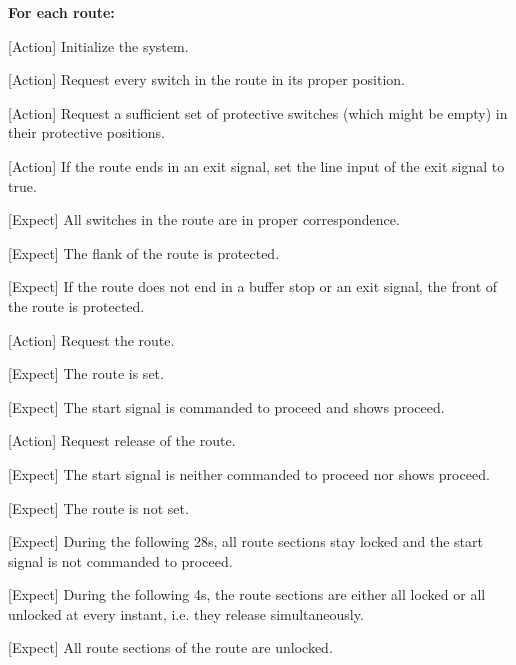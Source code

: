 \documentclass[10pt,a4paper]{article}
\begin{document}
\begin{procedurebox}
  \textbf{For each route:}
  \begin{teststeps}
    \item \textnormal{[Action]} Initialize the system.
    \item \textnormal{[Action]} Request every switch in the route in its proper position.
    \item \textnormal{[Action]} Request a sufficient set of protective switches (which might be empty) in their protective positions.
    \item \textnormal{[Action]} If the route ends in an exit signal, set the line input of the exit signal to true.
    \item \textnormal{[Expect]} All switches in the route are in proper correspondence.
    \item \textnormal{[Expect]} The flank of the route is protected.
    \item \textnormal{[Expect]} If the route does not end in a buffer stop or an exit signal, the front of the route is protected.
    \item \textnormal{[Action]} Request the route.
    \item \textnormal{[Expect]} The route is set.
    \item \textnormal{[Expect]} The start signal is commanded to proceed and shows proceed.
    \item \textnormal{[Action]} Request release of the route.
    \item \textnormal{[Expect]} The start signal is neither commanded to proceed nor shows proceed.
    \item \textnormal{[Expect]} The route is not set.
    \item \textnormal{[Expect]} During the following 28s, all route sections stay locked and the start signal is not commanded to proceed.
    \item \textnormal{[Expect]} During the following 4s, the route sections are either all locked or all unlocked at every instant, i.e. they release simultaneously.
    \item \textnormal{[Expect]} All route sections of the route are unlocked.
  \end{teststeps}
\end{procedurebox}
\end{document}

